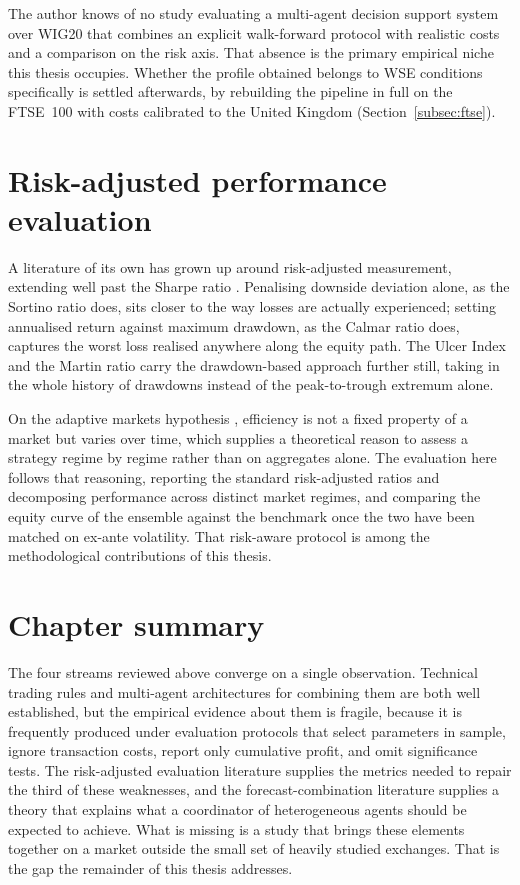 The author knows of no study evaluating a multi-agent decision support system over WIG20 that combines an explicit walk-forward protocol with realistic costs and a comparison on the risk axis. That absence is the primary empirical niche this thesis occupies. Whether the profile obtained belongs to WSE conditions specifically is settled afterwards, by rebuilding the pipeline in full on the FTSE~100 with costs calibrated to the United Kingdom (Section~\ref{subsec:ftse}).

\section{Risk-adjusted performance evaluation}\label{sec:sota_risk}

A literature of its own has grown up around risk-adjusted measurement, extending well past the Sharpe ratio \cite{sharpe1966}. Penalising downside deviation alone, as the Sortino ratio \cite{sortino1994} does, sits closer to the way losses are actually experienced; setting annualised return against maximum drawdown, as the Calmar ratio \cite{young1991} does, captures the worst loss realised anywhere along the equity path. The Ulcer Index and the Martin ratio \cite{martin1989} carry the drawdown-based approach further still, taking in the whole history of drawdowns instead of the peak-to-trough extremum alone.

On the adaptive markets hypothesis \cite{lo2004}, efficiency is not a fixed property of a market but varies over time, which supplies a theoretical reason to assess a strategy regime by regime rather than on aggregates alone. The evaluation here follows that reasoning, reporting the standard risk-adjusted ratios and decomposing performance across distinct market regimes, and comparing the equity curve of the ensemble against the benchmark once the two have been matched on ex-ante volatility. That risk-aware protocol is among the methodological contributions of this thesis.

\section{Chapter summary}\label{sec:sota_summary}

The four streams reviewed above converge on a single observation. Technical trading rules and multi-agent architectures for combining them are both well established, but the empirical evidence about them is fragile, because it is frequently produced under evaluation protocols that select parameters in sample, ignore transaction costs, report only cumulative profit, and omit significance tests. The risk-adjusted evaluation literature supplies the metrics needed to repair the third of these weaknesses, and the forecast-combination literature supplies a theory that explains what a coordinator of heterogeneous agents should be expected to achieve. What is missing is a study that brings these elements together on a market outside the small set of heavily studied exchanges. That is the gap the remainder of this thesis addresses.
